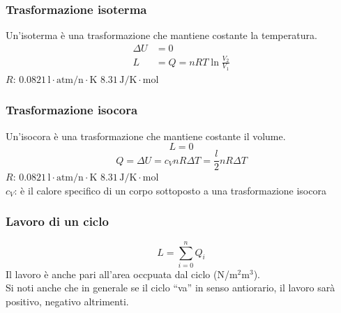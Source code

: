 \subsubsection{Trasformazione isoterma}
Un'isoterma è una trasformazione che mantiene costante la temperatura.
\begin{align*}
  \Delta U &= 0\\
  L &= Q = nRT\ln\frac{V_2}{V_1}
\end{align*}
\hyperref[tab:R]{$R$}: $0.0821\,\text{l}\cdot\text{atm/n}\cdot\text{K}$
$8.31\,\text{J/K}\cdot\text{mol}$\\

\subsubsection{Trasformazione isocora}
Un'isocora è una trasformazione che mantiene costante il volume.
\begin{equation*}
  L = 0
\end{equation*}
\begin{equation*}
  Q = \Delta U = c_VnR\Delta T =\frac{l}{2}nR\Delta T
\end{equation*}
\hyperref[tab:R]{$R$}: $0.0821\,\text{l}\cdot\text{atm/n}\cdot\text{K}$
$8.31\,\text{J/K}\cdot\text{mol}$\\
$c_V$: è il calore specifico di un corpo sottoposto a una trasformazione isocora

\subsubsection{Lavoro di un ciclo}
\begin{center}
\end{center}
\begin{equation*}
  L = \sum\limits_{i=0}^{n} Q_i
\end{equation*}
Il lavoro è anche pari all'area occpuata dal ciclo (N/$\text{m}^2\text{m}^3$).\\
Si noti anche che in generale se il ciclo ``va'' in senso antiorario, il lavoro sarà positivo,
negativo altrimenti.

